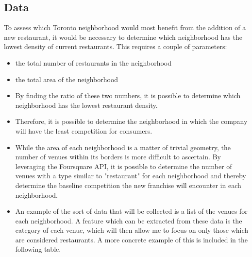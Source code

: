\documentclass[aspectratio=169]{beamer}
\begin{document}
\subsection{Data}
\begin{frame}

To assess which Toronto neighborhood would most benefit from the addition of a new restaurant, it would be necessary to determine which neighborhood has the lowest density of current restaurants. This requires a couple of parameters:

\begin{itemize}
 \item the total number of restaurants in the neighborhood
 \item the total area of the neighborhood
\end{itemize}
\end{frame}

\begin{frame}

\begin{itemize}
 \item By finding the ratio of these two numbers, it is possible to determine which neighborhood has the lowest restaurant density.
 \item Therefore, it is possible to determine the neighborhood in which the company will have the least competition for consumers.
 \item While the area of each neighborhood is a matter of trivial geometry, the number of venues within its borders is more difficult to ascertain. By leveraging the Foursquare API, it is possible to determine the number of venues with a type similar to "restaurant" for each neighborhood and thereby determine the baseline competition the new franchise will encounter in each neighborhood.

 \item An example of the sort of data that will be collected is a list of the venues for each neighborhood. A feature which can be extracted from these data is the category of each venue, which will then allow me to focus on only those which are considered restaurants. A more concrete example of this is included in the following table.
\end{itemize}

\end{frame}
\end{document}
